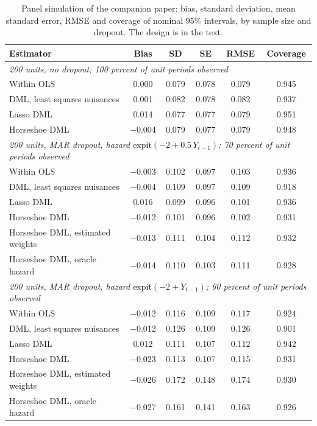 \begin{table}[ht]
\centering
\caption{Panel simulation of the companion paper: bias, standard deviation, mean standard error, RMSE and coverage of nominal 95\% intervals, by sample size and dropout. The design is in the text.}
\label{tab:hbdml:panel}
\scriptsize
\begin{tabular}{lccccc}
\toprule
Estimator & Bias & SD & SE & RMSE & Coverage \\
\midrule
\multicolumn{6}{l}{\emph{200 units, no dropout; 100 percent of unit periods observed}} \\
Within OLS & 0.000 & 0.079 & 0.078 & 0.079 & 0.945 \\
DML, least squares nuisances & 0.001 & 0.082 & 0.078 & 0.082 & 0.937 \\
Lasso DML & 0.014 & 0.077 & 0.077 & 0.079 & 0.951 \\
Horseshoe DML & $-$0.004 & 0.079 & 0.077 & 0.079 & 0.948 \\
\midrule
\multicolumn{6}{l}{\emph{200 units, MAR dropout, hazard $\mathrm{expit}(-2 + 0.5\,Y_{t-1})$; 70 percent of unit periods observed}} \\
Within OLS & $-$0.003 & 0.102 & 0.097 & 0.103 & 0.936 \\
DML, least squares nuisances & $-$0.004 & 0.109 & 0.097 & 0.109 & 0.918 \\
Lasso DML & 0.016 & 0.099 & 0.096 & 0.101 & 0.936 \\
Horseshoe DML & $-$0.012 & 0.101 & 0.096 & 0.102 & 0.931 \\
Horseshoe DML, estimated weights & $-$0.013 & 0.111 & 0.104 & 0.112 & 0.932 \\
Horseshoe DML, oracle hazard & $-$0.014 & 0.110 & 0.103 & 0.111 & 0.928 \\
\midrule
\multicolumn{6}{l}{\emph{200 units, MAR dropout, hazard $\mathrm{expit}(-2 + Y_{t-1})$; 60 percent of unit periods observed}} \\
Within OLS & $-$0.012 & 0.116 & 0.109 & 0.117 & 0.924 \\
DML, least squares nuisances & $-$0.012 & 0.126 & 0.109 & 0.126 & 0.901 \\
Lasso DML & 0.012 & 0.111 & 0.107 & 0.112 & 0.942 \\
Horseshoe DML & $-$0.023 & 0.113 & 0.107 & 0.115 & 0.931 \\
Horseshoe DML, estimated weights & $-$0.026 & 0.172 & 0.148 & 0.174 & 0.930 \\
Horseshoe DML, oracle hazard & $-$0.027 & 0.161 & 0.141 & 0.163 & 0.926 \\

\end{tabular}
\end{table}
